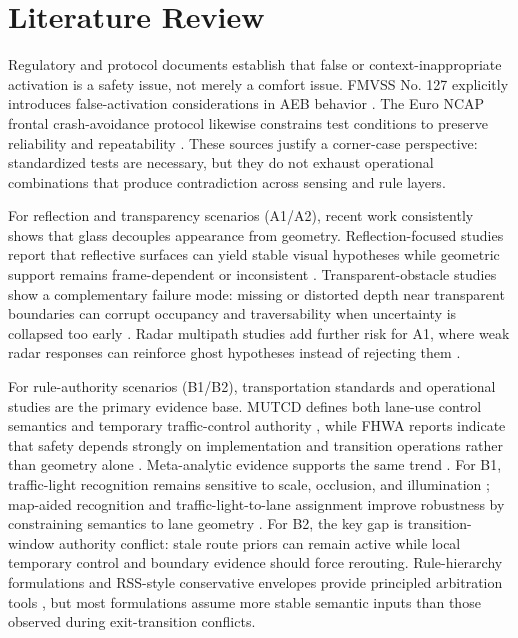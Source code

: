 \documentclass[sigconf,nonacm]{acmart}
\begin{document}
\section{Literature Review}
Regulatory and protocol documents establish that false or context-inappropriate activation is a safety issue, not merely a comfort issue. FMVSS No. 127 explicitly introduces false-activation considerations in AEB behavior \cite{nhtsa2024}. The Euro NCAP frontal crash-avoidance protocol likewise constrains test conditions to preserve reliability and repeatability \cite{euroncap2025}. These sources justify a corner-case perspective: standardized tests are necessary, but they do not exhaust operational combinations that produce contradiction across sensing and rule layers.

For reflection and transparency scenarios (A1/A2), recent work consistently shows that glass decouples appearance from geometry. Reflection-focused studies report that reflective surfaces can yield stable visual hypotheses while geometric support remains frame-dependent or inconsistent \cite{zhao2024ref,li2024plane}. Transparent-obstacle studies show a complementary failure mode: missing or distorted depth near transparent boundaries can corrupt occupancy and traversability when uncertainty is collapsed too early \cite{tibebu2021glass,weerakoon2024topgn}. Radar multipath studies add further risk for A1, where weak radar responses can reinforce ghost hypotheses instead of rejecting them \cite{zheng2024radar}.

For rule-authority scenarios (B1/B2), transportation standards and operational studies are the primary evidence base. MUTCD defines both lane-use control semantics and temporary traffic-control authority \cite{mutcd2023}, while FHWA reports indicate that safety depends strongly on implementation and transition operations rather than geometry alone \cite{fhwa2019,fhwa2008}. Meta-analytic evidence supports the same trend \cite{manuel2020}. For B1, traffic-light recognition remains sensitive to scale, occlusion, and illumination \cite{behrendt2017,jensen2018}; map-aided recognition and traffic-light-to-lane assignment improve robustness by constraining semantics to lane geometry \cite{hirabayashi2019,monninger2023}. For B2, the key gap is transition-window authority conflict: stale route priors can remain active while local temporary control and boundary evidence should force rerouting. Rule-hierarchy formulations and RSS-style conservative envelopes provide principled arbitration tools \cite{veer2022,shalev2017}, but most formulations assume more stable semantic inputs than those observed during exit-transition conflicts.
\end{document}
